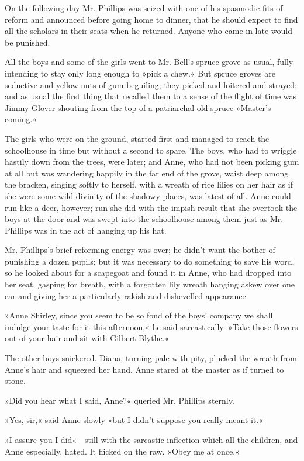 On the following day Mr. Phillips was seized with one of his spasmodic fits of reform and announced before going home to dinner, that he should expect to find all the scholars in their seats when he returned. Anyone who came in late would be punished.

All the boys and some of the girls went to Mr. Bell’s spruce grove as usual, fully intending to stay only long enough to »pick a chew.« But spruce groves are seductive and yellow nuts of gum beguiling; they picked and loitered and strayed; and as usual the first thing that recalled them to a sense of the flight of time was Jimmy Glover shouting from the top of a patriarchal old spruce »Master’s coming.«

The girls who were on the ground, started first and managed to reach the schoolhouse in time but without a second to spare. The boys, who had to wriggle hastily down from the trees, were later; and Anne, who had not been picking gum at all but was wandering happily in the far end of the grove, waist deep among the bracken, singing softly to herself, with a wreath of rice lilies on her hair as if she were some wild divinity of the shadowy places, was latest of all. Anne could run like a deer, however; run she did with the impish result that she overtook the boys at the door and was swept into the schoolhouse among them just as Mr. Phillips was in the act of hanging up his hat.

Mr. Phillips’s brief reforming energy was over; he didn’t want the bother of punishing a dozen pupils; but it was necessary to do something to save his word, so he looked about for a scapegoat and found it in Anne, who had dropped into her seat, gasping for breath, with a forgotten lily wreath hanging askew over one ear and giving her a particularly rakish and dishevelled appearance.

»Anne Shirley, since you seem to be so fond of the boys’ company we shall indulge your taste for it this afternoon,« he said sarcastically. »Take those flowers out of your hair and sit with Gilbert Blythe.«

The other boys snickered. Diana, turning pale with pity, plucked the wreath from Anne’s hair and squeezed her hand. Anne stared at the master as if turned to stone.

»Did you hear what I said, Anne?« queried Mr. Phillips sternly.

»Yes, sir,« said Anne slowly »but I didn’t suppose you really meant it.«

»I assure you I did«—still with the sarcastic inflection which all the children, and Anne especially, hated. It flicked on the raw. »Obey me at once.«

